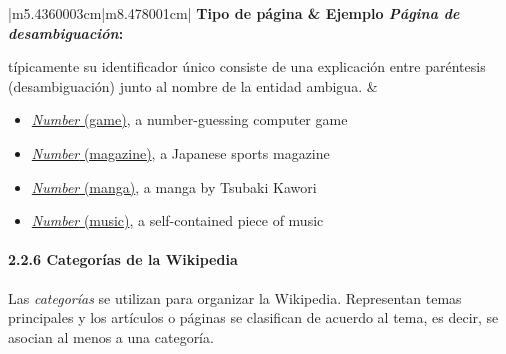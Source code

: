 \documentclass[letterpaper]{article}
\makeatletter
\newcommand\arraybslash{\let\\\@arraycr}
\newcommand\liststyleLiv{%
\renewcommand\labelitemi{{\textbullet}}
\renewcommand\labelitemii{${\circ}$}
\renewcommand\labelitemiii{${\blacksquare}$}
\renewcommand\labelitemiv{{\textbullet}}
}
\makeatother
\begin{document}
\begin{center}
\label{seq:refTable6}\tablehead{}
\begin{supertabular}{|m{5.4360003cm}|m{8.478001cm}|}
\hline
\centering {}\bfseries Tipo de p\'agina &
\centering\arraybslash {}\bfseries Ejemplo\\\hline
{ \textit{P\'agina de desambiguaci\'on}:}

 t\'ipicamente su identificador \'unico consiste
de una explicaci\'on entre par\'entesis (desambiguaci\'on) junto al
nombre de la entidad ambigua. &
\liststyleLiv
\begin{itemize}
\item {}
\href{http://en.wikipedia.org/wiki/Number_(game)}{\textit{Number}}\href{http://en.wikipedia.org/wiki/Number_(game)}{
(game)}, a number-guessing computer game \item {}
\href{http://en.wikipedia.org/wiki/Number_(magazine)}{\textit{Number}}\href{http://en.wikipedia.org/wiki/Number_(magazine)}{
(magazine)}, a Japanese sports magazine \item {}
\href{http://en.wikipedia.org/wiki/Number_(manga)}{\textit{Number}}\href{http://en.wikipedia.org/wiki/Number_(manga)}{
(manga)}, a manga by Tsubaki Kawori \item {}
\href{http://en.wikipedia.org/wiki/Number_(music)}{\foreignlanguage{english}{\textit{\textcolor[rgb]{0.0,0.0,0.5019608}{Number}}}}\href{http://en.wikipedia.org/wiki/Number_(music)}{\foreignlanguage{english}{\textcolor[rgb]{0.0,0.0,0.5019608}{
(music)}}}, a self-contained piece of music\end{itemize}
\\\hline
\end{supertabular}
\end{center}

\bigskip

\paragraph[2.2.6 Categor\'ias de la Wikipedia]{2.2.6 Categor\'ias de la
Wikipedia}
\hypertarget{RefHeading333057232820}{}
\bigskip

{\sffamily
Las \textit{categor\'ias} se utilizan para organizar la Wikipedia.
Representan temas principales y los art\'iculos o p\'aginas se
clasifican de acuerdo al tema, es decir, se asocian al menos a una
categor\'ia.}
\end{document}
